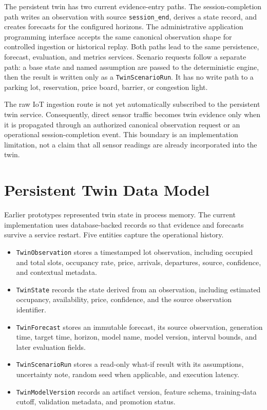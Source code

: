 \documentclass[conference]{IEEEtran}
\begin{document}
The persistent twin has two current evidence-entry paths. The session-completion path writes an observation with source \texttt{session\_end}, derives a state record, and creates forecasts for the configured horizons. The administrative application programming interface accepts the same canonical observation shape for controlled ingestion or historical replay. Both paths lead to the same persistence, forecast, evaluation, and metrics services. Scenario requests follow a separate path: a base state and named assumption are passed to the deterministic engine, then the result is written only as a \texttt{TwinScenarioRun}. It has no write path to a parking lot, reservation, price board, barrier, or congestion light.

The raw IoT ingestion route is not yet automatically subscribed to the persistent twin service. Consequently, direct sensor traffic becomes twin evidence only when it is propagated through an authorized canonical observation request or an operational session-completion event. This boundary is an implementation limitation, not a claim that all sensor readings are already incorporated into the twin.

\section{Persistent Twin Data Model}

Earlier prototypes represented twin state in process memory. The current implementation uses database-backed records so that evidence and forecasts survive a service restart. Five entities capture the operational history.

\begin{itemize}
\item \texttt{TwinObservation} stores a timestamped lot observation, including occupied and total slots, occupancy rate, price, arrivals, departures, source, confidence, and contextual metadata.
\item \texttt{TwinState} records the state derived from an observation, including estimated occupancy, availability, price, confidence, and the source observation identifier.
\item \texttt{TwinForecast} stores an immutable forecast, its source observation, generation time, target time, horizon, model name, model version, interval bounds, and later evaluation fields.
\item \texttt{TwinScenarioRun} stores a read-only what-if result with its assumptions, uncertainty note, random seed when applicable, and execution latency.
\item \texttt{TwinModelVersion} records an artifact version, feature schema, training-data cutoff, validation metadata, and promotion status.
\end{itemize}
\end{document}
